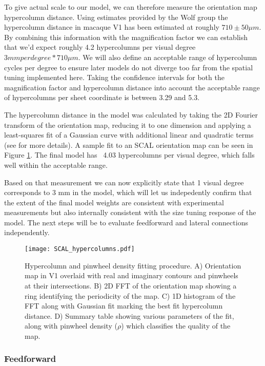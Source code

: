 To give actual scale to our model, we can therefore measure the
orientation map hypercolumn distance. Using estimates provided by the
Wolf group the hypercolumn distance in macaque V1 has been estimated
at roughly \(710 \pm 50 \mu m\). By combining this information with
the magnification factor we can establish that we'd expect roughly 4.2
hypercolumns per visual degree \(3 mm per degree * 710 \mu m\). We will also
define an acceptable range of hypercolumn cycles per degree to ensure
later models do not diverge too far from the spatial tuning
implemented here. Taking the confidence intervals for both the
magnification factor and hypercolumn distance into account the
acceptable range of hypercolumns per sheet coordinate is between 3.29
and 5.3.

The hypercolumn distance in the model was calculated by taking the 2D
Fourier transform of the orientation map, reducing it to one dimension
and applying a least-squares fit of a Gaussian curve with additional
linear and quadratic terms (see \cite{Kaschube2010} for more
details). A sample fit to an SCAL orientation map can be seen in
Figure \ref{SCALhypercolumns}. The final model has ~4.03 hypercolumns
per visual degree, which falls well within the acceptable range.

Based on that measurement we can now explicitly state that 1 visual
degree corresponds to 3 mm in the model, which will let us
indepedently confirm that the extent of the final model weights are
consistent with experimental measurements but also internally
consistent with the size tuning response of the model. The next steps
will be to evaluate feedforward and lateral connections independently.

\begin{figure}
	\centering
        \texttt{[image: SCAL\_hypercolumns.pdf]}
	\caption{Hypercolumn and pinwheel density fitting procedure. A)
      Orientation map in V1 overlaid with real and imaginary contours
      and pinwheels at their intersections. B) 2D FFT of the
      orientation map showing a ring identifying the periodicity of
      the map. C) 1D histogram of the FFT along with Gaussian fit
      marking the best fit hypercolumn distance. D) Summary table
      showing various parameters of the fit, along with pinwheel
      density ($\rho$) which classifies the quality of the map.}
	\label{SCALhypercolumns}
\end{figure}

\subsubsection{Feedforward}

